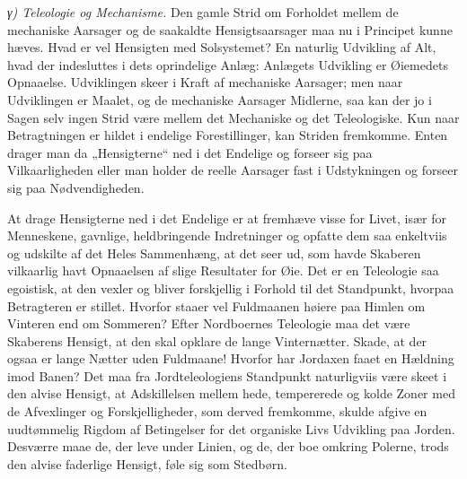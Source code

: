 \documentclass[12pt,a4paper]{book}
\newcommand{\subrunin}[1]{\emph{#1}\hspace{0.4em}}
\begin{document}
\subrunin{γ) Teleologie og Mechanisme.} Den gamle Strid om Forholdet mellem de
mechaniske Aarsager og de saakaldte Hensigtsaarsager maa nu i Principet kunne
hæves. Hvad er vel Hensigten med Solsystemet? En naturlig Udvikling af Alt,
hvad der indesluttes i dets oprindelige Anlæg:
Anlægets Udvikling er Øiemedets Opnaaelse. Udviklingen skeer i Kraft af
mechaniske Aarsager; men naar Udviklingen er Maalet, og de mechaniske Aarsager
Midlerne, saa kan der jo i Sagen selv ingen Strid være mellem det Mechaniske og
det Teleologiske. Kun naar Betragtningen er hildet i endelige Forestillinger,
kan Striden fremkomme. Enten drager man da „Hensigterne“ ned i det Endelige og
forseer sig paa Vilkaarligheden eller man holder de reelle Aarsager fast i
Udstykningen og forseer sig paa Nødvendigheden.

At drage Hensigterne ned i det Endelige er at fremhæve visse for Livet, især
for Menneskene, gavnlige, heldbringende Indretninger og opfatte dem saa
enkeltviis og udskilte af det Heles Sammenhæng, at det seer ud, som havde
Skaberen vilkaarlig havt Opnaaelsen af slige Resultater for Øie. Det er en
Teleologie saa egoistisk, at den vexler og bliver forskjellig i Forhold til det
Standpunkt, hvorpaa Betragteren er stillet. Hvorfor staaer vel Fuldmaanen
høiere paa Himlen om Vinteren end om Sommeren? Efter Nordboernes Teleologie maa
det være Skaberens Hensigt, at den skal opklare de lange Vinternætter. Skade,
at der ogsaa er lange Nætter uden Fuldmaane! Hvorfor har Jordaxen faaet en
Hældning imod Banen? Det maa fra Jordteleologiens Standpunkt naturligviis være
skeet i den alvise Hensigt, at Adskillelsen mellem hede, tempererede og kolde
Zoner med de Afvexlinger og Forskjelligheder, som derved fremkomme, skulde
afgive en uudtømmelig Rigdom af Betingelser for det organiske Livs Udvikling
paa Jorden. Desværre maae de, der leve under Linien, og de, der boe omkring
Polerne, trods den alvise faderlige Hensigt, føle sig som Stedbørn.
\end{document}
